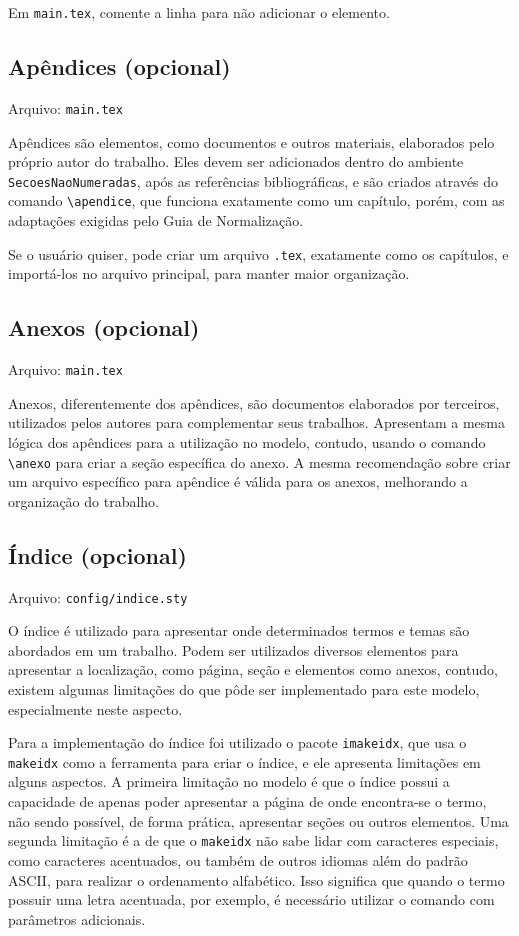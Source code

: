     Em \texttt{main.tex}, comente a linha \verb|| para não adicionar o elemento.

\subsection{Apêndices (opcional)}
    Arquivo: \texttt{main.tex}
    
    Apêndices são elementos, como documentos e outros materiais, elaborados pelo próprio autor do trabalho. Eles devem ser adicionados dentro do ambiente \\\texttt{SecoesNaoNumeradas}, após as referências bibliográficas, e são criados através do comando \verb|\apendice|, que funciona exatamente como um capítulo, porém, com as adaptações exigidas pelo Guia de Normalização.

    Se o usuário quiser, pode criar um arquivo \texttt{.tex}, exatamente como os capítulos, e importá-los no arquivo principal, para manter maior organização.

\subsection{Anexos (opcional)}
    Arquivo: \texttt{main.tex}
    
    Anexos, diferentemente dos apêndices, são documentos elaborados por terceiros, utilizados pelos autores para complementar seus trabalhos. Apresentam a mesma lógica dos apêndices para a utilização no modelo, contudo, usando o comando \verb|\anexo| para criar a seção específica do anexo. A mesma recomendação sobre criar um arquivo específico para apêndice é válida para os anexos, melhorando a organização do trabalho.

\subsection{Índice (opcional)}
    Arquivo: \texttt{config/indice.sty}

    O índice é utilizado para apresentar onde determinados termos e temas são abordados em um trabalho. Podem ser utilizados diversos elementos para apresentar a localização, como página, seção e elementos como anexos, contudo, existem algumas limitações do que pôde ser implementado para este modelo, especialmente neste aspecto.
    
    Para a implementação do índice foi utilizado o pacote \texttt{imakeidx}, que usa o \texttt{makeidx} como a ferramenta para criar o índice, e ele apresenta limitações em alguns aspectos. A primeira limitação no modelo é que o índice possui a capacidade de apenas poder apresentar a página de onde encontra-se o termo, não sendo possível, de forma prática, apresentar seções ou outros elementos. Uma segunda limitação é a de que o \texttt{makeidx} não sabe lidar com caracteres especiais, como caracteres acentuados, ou também de outros idiomas além do padrão ASCII, para realizar o ordenamento alfabético. Isso significa que quando o termo possuir uma letra acentuada, por exemplo, é necessário utilizar o comando com parâmetros adicionais.
    
